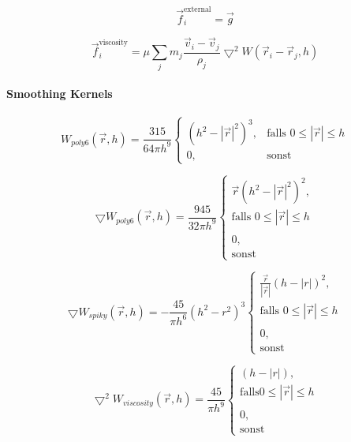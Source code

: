 \documentclass[a4paper]{paper}
\begin{document}
\begin{equation}
\label{force_external}
\vec{f}^{\text{external}}_{i} = \vec{g}
\end{equation}

\begin{equation}
\label{force_viscosity}
\vec{f}^{\text{viscosity}}_{i} = \mu \sum_{j}m_{j}\frac{\vec{v}_{i} - \vec{v}_{j}}{\rho_{j}}\bigtriangledown^2 W(\vec{r}_{i}-\vec{r}_{j},h)
\end{equation}

\paragraph{Smoothing Kernels}

\begin{equation}
\label{poly6}
W_{poly6}(\vec{r},h) = \frac{315}{64 \pi h^9} 
\begin{cases}
(h^2-|\vec{r}|^2)^3, & \text{falls } 0 \leq |\vec{r}| \leq h \\
0, & \text{sonst}
\end{cases}
\end{equation}

\begin{equation}
\label{gradient_poly6}
\bigtriangledown W_{poly6}(\vec{r},h) = \frac{945}{32 \pi h^9} 
\begin{cases}
\vec{r}(h^2-|\vec{r}|^2)^2, \\ \text{falls } 0 \leq |\vec{r}| \leq h  \\
\\
0, \\ \text{sonst}
\end{cases}
\end{equation}

\begin{equation}
\label{spiky}
\bigtriangledown W_{spiky}(\vec{r},h) = -\frac{45}{\pi h^6} (h^2-r^2)^3
\begin{cases}
\frac{\vec{r}}{|\vec{r}|}(h-|r|)^2, \\ \text{falls } 0 \leq |\vec{r}| \leq h\\

\\ 0, \\ \text{sonst}
\end{cases}
\end{equation}

\begin{equation}
\label{viscosity}
\bigtriangledown^2 W_{viscosity}(\vec{r},h) = \frac{45}{\pi h^9} 
\begin{cases}
(h-|r|),

\\ \text{falls} 0 \leq |\vec{r}| \leq h \\
\\
0, 
\\ \text{sonst}
\end{cases}
\end{equation}
\end{document}
